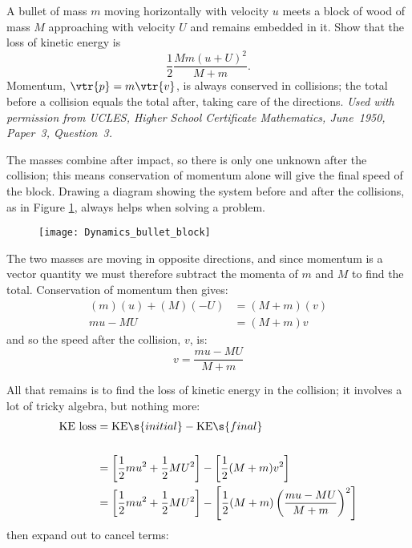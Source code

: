 \begin{hint}
{A bullet of mass $m$ moving horizontally with velocity $u$ meets a block of wood of mass $M$ approaching with velocity $U$ and remains embedded in it.  Show that the loss of kinetic energy is
\begin{equation*}
 \frac{1}{2} \frac{Mm(u+U)^{2}}{M+m}.
\end{equation*}
} 
{Momentum, $\vtr{p} = m\vtr{v}$, is always conserved in collisions; the total before a collision equals the total after, taking care of the directions.}
{\textit{Used with permission from UCLES, Higher School Certificate Mathematics, June~1950, Paper~3, Question~3.}}
{The masses combine after impact, so there is only one unknown after the collision; this means conservation of momentum alone will give the final speed of the block. Drawing a diagram showing the system before and after the collisions, as in Figure \ref{fig:Dynamics_bullet_block}, always helps when solving a problem.

\begin{figure}[h]
	\centering
	\texttt{[image: Dynamics\_bullet\_block]}
	\caption{}
	\label{fig:Dynamics_bullet_block}
\end{figure}

The two masses are moving in opposite directions, and since momentum is a vector quantity we must therefore subtract the momenta of $m$ and $M$ to find the total. Conservation of momentum then gives:
	\begin{align*} (m)(u) + (M)(-U) &= (M + m)(v) \\ mu - MU &= (M + m)v\end{align*}
and so the speed after the collision, $v$, is:
	\begin{equation*} v = \frac{mu - MU}{M + m} \end{equation*}

All that remains is to find the loss of kinetic energy in the collision; it involves a lot of tricky algebra, but nothing more:
\begin{align*} \textrm{KE loss} &= \textrm{KE}\s{initial} - \textrm{KE}\s{final} \\ \\
	&= \left[\frac{1}{2}mu^{2} + \frac{1}{2}MU^{2}\right] - \left[\frac{1}{2}(M + m)v^{2}\right] \\
	 &=  \left[\frac{1}{2}mu^{2} + \frac{1}{2}MU^{2}\right] - \left[\frac{1}{2}(M + m)\left(\frac{mu - MU}{M + m}\right)^{2}\right]
\end{align*} then expand out to cancel terms:

}
\end{hint}
